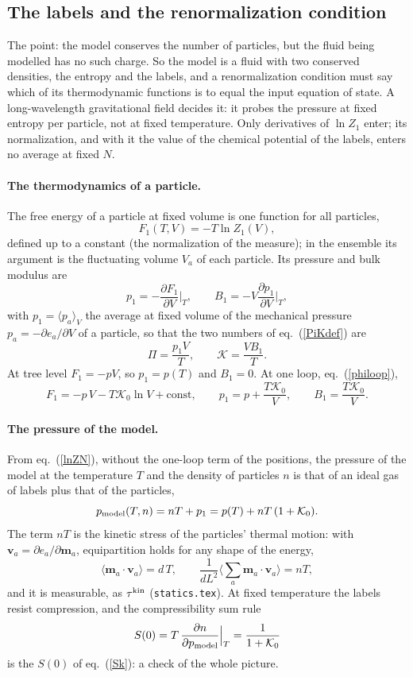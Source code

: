 \documentclass[11pt,aps,preprint,nofootinbib,superscriptaddress,tightenlines]{revtex4-2}
\newcommand{\avg}[1]{\langle #1\rangle}
\def\st{\begin{equation}}
\def\stp{\end{equation}}
\def\Eq#1{eq.~(\ref{#1})}
\let\oldparagraph\paragraph
\renewcommand{\paragraph}{\par\bigskip\oldparagraph}
\begin{document}
\subsection{The labels and the renormalization condition}
\label{app:labels}

The point: the model conserves the number of particles, but the fluid being modelled has no such charge.  So the model is a fluid with two
conserved densities, the entropy and the labels, and a renormalization condition must say which of its thermodynamic functions is to equal the
input equation of state.  A long-wavelength gravitational field decides it: it probes the pressure at fixed entropy per particle, not at fixed
temperature.  Only derivatives of $\ln Z_1$ enter; its normalization, and with it the value of the chemical potential of the labels, enters no average
at fixed $N$.

\paragraph{The thermodynamics of a particle.}  The free energy of a particle at fixed volume is one function for all particles,
\st
F_1(T,V)=-T\ln Z_1(V),
\stp
defined up to a constant (the normalization of the measure); in the ensemble its argument is the fluctuating volume $V_a$ of each particle.  Its pressure and bulk modulus are
\st
p_1=-\frac{\partial F_1}{\partial V}\Big|_T,\qquad B_1=-V\frac{\partial p_1}{\partial V}\Big|_T,
\stp
with $p_1=\avg{p_a}_V$ the average at fixed volume of the mechanical pressure $p_a=-\partial e_a/\partial V$ of a particle, so that the two numbers of
\Eq{PiKdef} are
\st
\Pi=\frac{p_1V}{T},\qquad \mathcal K=\frac{VB_1}{T} .
\stp
At tree level $F_1=-pV$, so $p_1=p(T)$ and $B_1=0$.  At one loop, \Eq{philoop},
\st
F_1=-p\,V-T\mathcal K_0\ln V+\text{const},\qquad p_1=p+\frac{T\mathcal K_0}{V},\qquad B_1=\frac{T\mathcal K_0}{V} .
\stp

\paragraph{The pressure of the model.}  From \Eq{lnZN}, without the one-loop term of the positions, the pressure of the model at the temperature $T$
and the density of particles $n$ is that of an ideal gas of labels plus that of the particles,
\st
p_{\rm model}(T,n)=nT+p_1=p(T)+nT\,(1+\mathcal K_0) .
\label{pmodel}
\stp
The term $nT$ is the kinetic stress of the particles' thermal motion: with $\bm v_a=\partial e_a/\partial\bm m_a$, equipartition holds for any shape of the
energy,
\st
\avg{\bm m_a\cdot\bm v_a}=d\,T,\qquad \frac1{dL^2}\Big\langle\sum_a\bm m_a\cdot\bm v_a\Big\rangle=nT ,
\stp
and it is measurable, as $\tau^{\rm kin}$ (\texttt{statics.tex}).  At fixed temperature the labels resist compression, and the compressibility sum rule
\st
S(0)=T\,\frac{\partial n}{\partial p_{\rm model}}\Big|_T=\frac1{1+\mathcal K_0}
\stp
is the $S(0)$ of \Eq{Sk}: a check of the whole picture.
\end{document}
